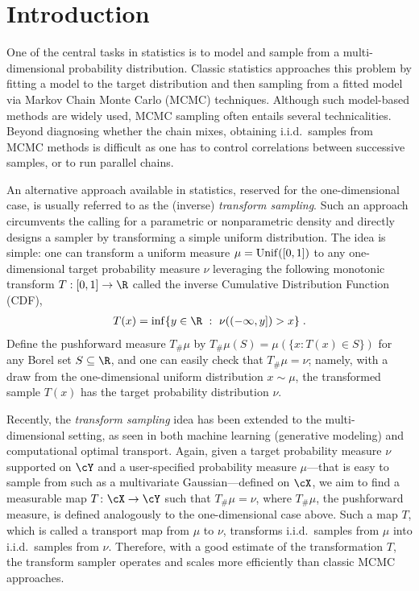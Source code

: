 \documentclass[11pt]{article}
\begin{document}
\section{Introduction}
One of the central tasks in statistics is to model and sample from a multi-dimensional probability distribution. Classic statistics approaches this problem by fitting a model to the target distribution and then sampling from a fitted model via Markov Chain Monte Carlo (MCMC) techniques. Although such model-based methods are widely used, MCMC sampling often entails several technicalities. Beyond diagnosing whether the chain mixes, obtaining i.i.d.\ samples from MCMC methods is difficult as one has to control correlations between successive samples, or to run parallel chains.

An alternative approach available in statistics, reserved for the one-dimensional case, is usually referred to as the (inverse) \textit{transform sampling}. Such an approach circumvents the calling for a parametric or nonparametric density and directly designs a sampler by transforming a simple uniform distribution. The idea is simple: one can transform a uniform measure $\mu = {\rm Unif}([0,1])$ to any one-dimensional target probability measure $\nu$ leveraging the following monotonic transform $T: [0, 1] \rightarrow \R$ called the inverse Cumulative Distribution Function (CDF),
\begin{align}
	\label{eqn:inv-cdf}
	T(x)= \inf \{ y \in \R ~:~ \nu((-\infty, y]) > x  \} \;.
\end{align}
Define the pushforward measure $T_\#\mu$ by $T_\#\mu(S) = \mu(\{ x : T(x) \in S \})$ for any Borel set $S\subseteq \R$, and one can easily check that $T_{\#} \mu = \nu$; namely, with a draw from the one-dimensional uniform distribution $x\sim \mu$, the transformed sample $T(x)$ has the target probability distribution $\nu$.

Recently, the \textit{transform sampling} idea has been extended to the multi-dimensional setting, as seen in both machine learning (generative modeling) and computational optimal transport. Again, given a target probability measure $\nu$ supported on $\cY$ and a user-specified probability measure $\mu$---that is easy to sample from such as a multivariate Gaussian---defined on $\cX$, we aim to find a measurable map $T \colon \cX \to \cY$ such that $T_{\#} \mu = \nu$, where $T_{\#} \mu$, the pushforward measure, is defined analogously to the one-dimensional case above. Such a map $T$, which is called a transport map from $\mu$ to $\nu$, transforms i.i.d.\ samples from $\mu$ into i.i.d.\ samples from $\nu$. Therefore,  with a good estimate of the transformation $T$, the transform sampler operates and scales more efficiently than classic MCMC approaches. 
\end{document}
